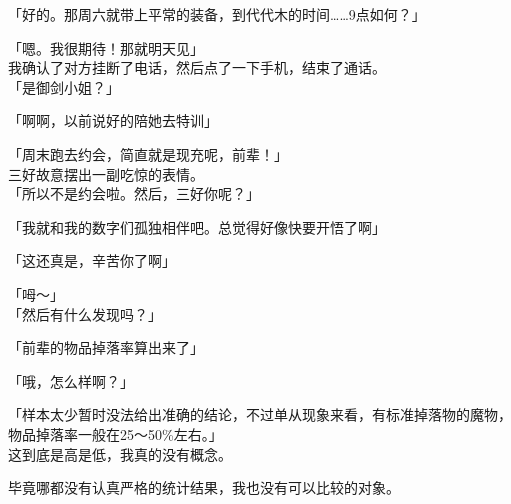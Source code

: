 「好的。那周六就带上平常的装备，到代代木的时间……9点如何？」

「嗯。我很期待！那就明天见」\\

我确认了对方挂断了电话，然后点了一下手机，结束了通话。\\

「是御剑小姐？」

「啊啊，以前说好的陪她去特训」

「周末跑去约会，简直就是现充呢，前辈！」\\

三好故意摆出一副吃惊的表情。\\

「所以不是约会啦。然后，三好你呢？」

「我就和我的数字们孤独相伴吧。总觉得好像快要开悟了啊」

「这还真是，辛苦你了啊」

「呣～」\\

「然后有什么发现吗？」

「前辈的物品掉落率算出来了」

「哦，怎么样啊？」

「样本太少暂时没法给出准确的结论，不过单从现象来看，有标准掉落物的魔物，物品掉落率一般在25～50\%左右。」\\

这到底是高是低，我真的没有概念。

毕竟哪都没有认真严格的统计结果，我也没有可以比较的对象。\\

